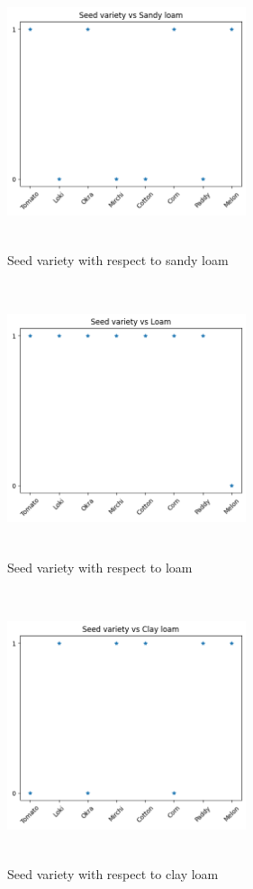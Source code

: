 \documentclass[pmlr,twocolumn,10pt]{jmlr}
\begin{document}
\begin{figure}[htp]
    \centering
    \includegraphics[width=7cm,height=8cm]{download (2).png}
    \caption{Seed variety with respect to sandy loam}
    \label{fig:galaxy}
\end{figure}

\begin{figure}[htp]
    \centering
    \includegraphics[width=7cm,height=8cm]{download (3).png}
    \caption{Seed variety with respect to loam}
    \label{fig:galaxy}
\end{figure}

\begin{figure}[htp]
    \centering
    \includegraphics[width=7cm,height=8cm]{download (4).png}
    \caption{Seed variety with respect to clay loam}
    \label{fig:galaxy}
\end{figure}
\end{document}
